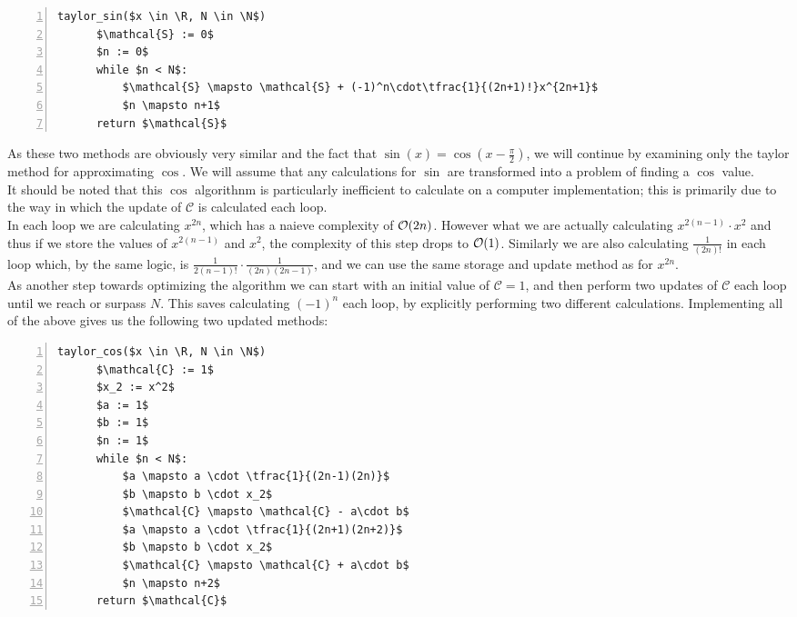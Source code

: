 {\begin{lstlisting}[numbers=left,frame=single,mathescape,caption={Taylor computation of \(\cos\) and \(\sin\)},label={PCD_"Taylor Cos/Sin"}]
  taylor_sin($x \in \R, N \in \N$)
      $\mathcal{S} := 0$
      $n := 0$
      while $n < N$:
          $\mathcal{S} \mapsto \mathcal{S} + (-1)^n\cdot\tfrac{1}{(2n+1)!}x^{2n+1}$
          $n \mapsto n+1$
      return $\mathcal{S}$
\end{lstlisting}

As these two methods are obviously very similar and the fact that \(\sin(x) = \cos(x - \frac{\pi}{2})\), we will continue by examining only the taylor method for approximating \(\cos\). We will assume that any calculations for \(\sin\) are transformed into a problem of finding a \(\cos\) value.\\

It should be noted that this \(\cos\) algorithnm is particularly inefficient to calculate on a computer implementation; this is primarily due to the way in which the update of \(\mathcal{C}\) is calculated each loop.\\

In each loop we are calculating \(x^{2n}\), which has a naieve complexity of \(\mathcal{O}(2n)\). However what we are actually calculating \(x^{2(n-1)}\cdot x^2\) and thus if we store the values of \(x^{2(n-1)}\) and \(x^2\), the complexity of this step drops to \(\mathcal{O}(1)\). Similarly we are also calculating \(\tfrac{1}{(2n)!}\) in each loop which, by the same logic, is \(\tfrac{1}{2(n-1)!} \cdot \tfrac{1}{(2n)(2n-1)}\), and we can use the same storage and update method as for \(x^{2n}\).\\

As another step towards optimizing the algorithm we can start with an initial value of \(\mathcal{C} = 1\), and then perform two updates of \(\mathcal{C}\) each loop until we reach or surpass \(N\). This saves calculating \((-1)^n\) each loop, by explicitly performing two different calculations. Implementing all of the above gives us the following two updated methods:

\begin{lstlisting}[numbers=left,frame=single,mathescape,caption={Taylor computation of \(\cos\) optimised},label={PCD_"Taylor Cos opt"}]
  taylor_cos($x \in \R, N \in \N$)
      $\mathcal{C} := 1$
      $x_2 := x^2$
      $a := 1$
      $b := 1$
      $n := 1$
      while $n < N$:
          $a \mapsto a \cdot \tfrac{1}{(2n-1)(2n)}$
          $b \mapsto b \cdot x_2$
          $\mathcal{C} \mapsto \mathcal{C} - a\cdot b$
          $a \mapsto a \cdot \tfrac{1}{(2n+1)(2n+2)}$
          $b \mapsto b \cdot x_2$
          $\mathcal{C} \mapsto \mathcal{C} + a\cdot b$
          $n \mapsto n+2$
      return $\mathcal{C}$
\end{lstlisting}

}
